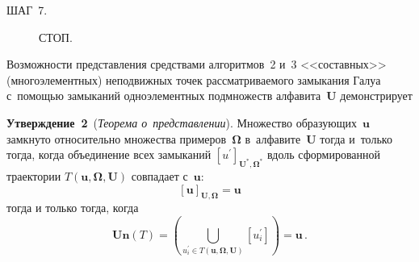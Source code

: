 \begin{multicols}{2}
\begin{description}
\item[ШАГ~7.] СТОП.

\end{description}


    Возможности представления средствами алгоритмов~2 и~3 
<<составных>> (многоэлементных) неподвижных точек рассматриваемого 
замыкания Галуа с~помощью замыканий одноэлементных подмножеств 
алфавита~$\mathbf{U}$ демонстрирует 
    
    \smallskip
    
    \noindent
    \textbf{Утверждение~2}\ (\textit{Теорема о~представлении}). Множество 
образующих~$\mathbf{u}$ замкнуто относительно множества 
примеров~${\boldsymbol{\Omega}}$ в~алфавите~$\mathbf{U}$ тогда и~только тогда, когда 
объединение всех замыканий $[u^\prime]_{\mathbf{U}^*,{\boldsymbol{\Omega}}^*}$ вдоль 
сформированной траектории $T(\mathbf{u}, {\boldsymbol{\Omega}}, \mathbf{U})$ 
совпадает с~$\mathbf{u}$: 
    $$
    [\mathbf{u}]_{\mathbf{U},{\boldsymbol{\Omega}}} =
    \mathbf{u}
    $$ 
тогда и только тогда, когда
$$ 
\mathbf{Un}(T) = \left ( 
\mathop{\bigcup}\limits_{u^\prime_i\in T(\mathbf{u},{\boldsymbol{\Omega}}, \mathbf{U})} \left[ 
u^\prime_i\right]\right) = 
\mathbf{u}\,.
    $$


\end{multicols}
